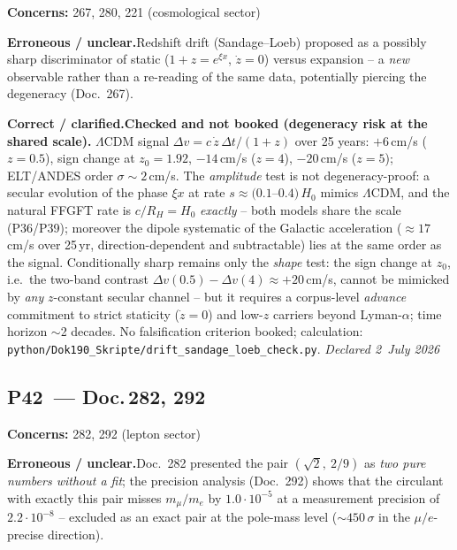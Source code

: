 \noindent\textbf{Concerns:} 267, 280, 221 (cosmological sector)


\smallskip\noindent\textbf{Erroneous / unclear.}\quad Redshift drift (Sandage--Loeb) proposed as a possibly sharp discriminator of static ($1+z=e^{\xi x}$, $\dot z=0$) versus expansion -- a \emph{new} observable rather than a re-reading of the same data, potentially piercing the degeneracy (Doc.~267).


\smallskip\noindent\textbf{Correct / clarified.}\quad \textbf{Checked and not booked (degeneracy risk at the shared scale).} $\Lambda$CDM signal $\Delta v=c\,\dot z\,\Delta t/(1+z)$ over 25 years: $+6$\,cm/s ($z{=}0.5$), sign change at $z_0=1.92$, $-14$\,cm/s ($z{=}4$), $-20$\,cm/s ($z{=}5$); ELT/ANDES order $\sigma\sim2$\,cm/s. The \emph{amplitude} test is not degeneracy-proof: a secular evolution of the phase $\xi x$ at rate $s\approx(0.1$--$0.4)\,H_0$ mimics $\Lambda$CDM, and the natural FFGFT rate is $c/R_H=H_0$ \emph{exactly} -- both models share the scale (P36/P39); moreover the dipole systematic of the Galactic acceleration ($\approx17$\,cm/s over 25\,yr, direction-dependent and subtractable) lies at the same order as the signal. Conditionally sharp remains only the \emph{shape} test: the sign change at $z_0$, i.e.\ the two-band contrast $\Delta v(0.5)-\Delta v(4)\approx+20$\,cm/s, cannot be mimicked by \emph{any} $z$-constant secular channel -- but it requires a corpus-level \emph{advance} commitment to strict staticity ($\dot z=0$) and low-$z$ carriers beyond Lyman-$\alpha$; time horizon $\sim$2 decades. No falsification criterion booked; calculation: \texttt{python/Dok190\_Skripte/drift\_sandage\_loeb\_check.py}. \emph{Declared 2~July 2026}


\medskip


\subsection*{P42~--- Doc.\,282, 292}

\noindent\textbf{Concerns:} 282, 292 (lepton sector)


\smallskip\noindent\textbf{Erroneous / unclear.}\quad Doc.~282 presented the pair $(\sqrt2,\ 2/9)$ as \emph{two pure numbers without a fit}; the precision analysis (Doc.~292) shows that the circulant with exactly this pair misses $m_\mu/m_e$ by $1.0\cdot10^{-5}$ at a measurement precision of $2.2\cdot10^{-8}$ -- excluded as an exact pair at the pole-mass level ($\sim450\,\sigma$ in the $\mu/e$-precise direction).


